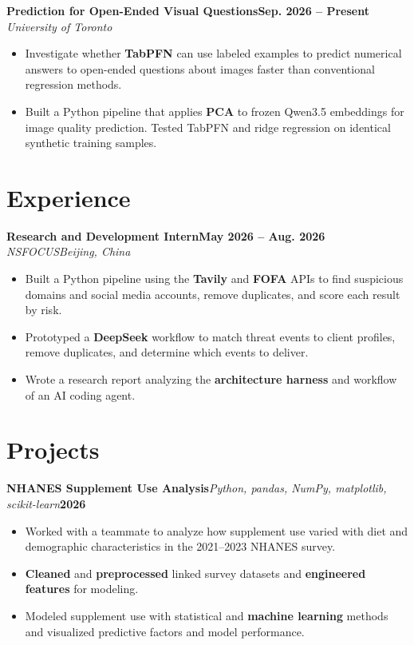 \documentclass[10pt]{article}
\newcommand{\projectline}[3]{\textbf{#1}\quad\textit{#2}\hfill\textbf{#3}}
\newcommand{\experienceline}[2]{\textbf{#1}\hfill \textbf{#2}}
\newcommand{\orgline}[2]{\textit{#1}\hfill \textit{#2}}
\begin{document}
\vspace{4pt}
\experienceline{Prediction for Open-Ended Visual Questions}{Sep. 2026 -- Present}\\[-1pt]
\orgline{University of Toronto}{}
\begin{itemize}
  \item Investigate whether \textbf{TabPFN} can use labeled examples to predict numerical answers to open-ended questions about images faster than conventional regression methods.
  \item Built a Python pipeline that applies \textbf{PCA} to frozen Qwen3.5 embeddings for image quality prediction. Tested TabPFN and ridge regression on identical synthetic training samples.
\end{itemize}

\section*{Experience}

\experienceline{Research and Development Intern}{May 2026 -- Aug. 2026}\\[-1pt]
\orgline{NSFOCUS}{Beijing, China}
\begin{itemize}
  \item Built a Python pipeline using the \textbf{Tavily} and \textbf{FOFA} APIs to find suspicious domains and social media accounts, remove duplicates, and score each result by risk.
  \item Prototyped a \textbf{DeepSeek} workflow to match threat events to client profiles, remove duplicates, and determine which events to deliver.
  \item Wrote a research report analyzing the \textbf{architecture harness} and workflow of an AI coding agent.
\end{itemize}

\section*{Projects}

\projectline{NHANES Supplement Use Analysis}{Python, pandas, NumPy, matplotlib, scikit-learn}{2026}
\begin{itemize}
  \item Worked with a teammate to analyze how supplement use varied with diet and demographic characteristics in the 2021--2023 NHANES survey.
  \item \textbf{Cleaned} and \textbf{preprocessed} linked survey datasets and \textbf{engineered features} for modeling.
  \item Modeled supplement use with statistical and \textbf{machine learning} methods and visualized predictive factors and model performance.
\end{itemize}
\end{document}
